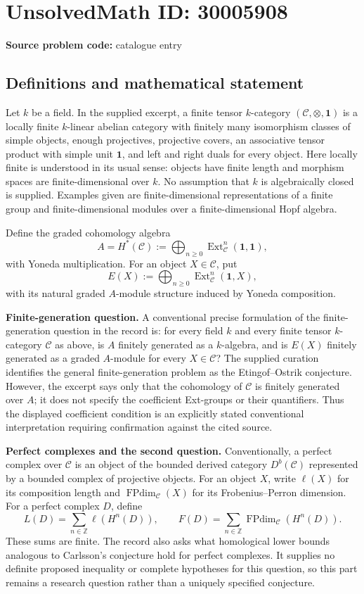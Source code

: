 \documentclass[11pt]{article}
\begin{document}
\section*{UnsolvedMath ID: 30005908}
\textbf{Source problem code:} catalogue entry
\subsection{Definitions and mathematical statement}
Let \(k\) be a field. In the supplied excerpt, a finite tensor \(k\)-category \((\mathcal C,\otimes,\mathbf 1)\) is a locally finite \(k\)-linear abelian category with finitely many isomorphism classes of simple objects, enough projectives, projective covers, an associative tensor product with simple unit \(\mathbf 1\), and left and right duals for every object. Here locally finite is understood in its usual sense: objects have finite length and morphism spaces are finite-dimensional over \(k\). No assumption that \(k\) is algebraically closed is supplied. Examples given are finite-dimensional representations of a finite group and finite-dimensional modules over a finite-dimensional Hopf algebra.

Define the graded cohomology algebra
\[
 A=H^*(\mathcal C):=\bigoplus_{n\geq 0}\operatorname{Ext}_{\mathcal C}^n(\mathbf 1,\mathbf 1),
\]
with Yoneda multiplication. For an object \(X\in\mathcal C\), put
\[
 E(X):=\bigoplus_{n\geq 0}\operatorname{Ext}_{\mathcal C}^n(\mathbf 1,X),
\]
with its natural graded \(A\)-module structure induced by Yoneda composition.

\textbf{Finite-generation question.} A conventional precise formulation of the finite-generation question in the record is: for every field \(k\) and every finite tensor \(k\)-category \(\mathcal C\) as above, is \(A\) finitely generated as a \(k\)-algebra, and is \(E(X)\) finitely generated as a graded \(A\)-module for every \(X\in\mathcal C\)? The supplied curation identifies the general finite-generation problem as the Etingof--Ostrik conjecture. However, the excerpt says only that the cohomology of \(\mathcal C\) is finitely generated over \(A\); it does not specify the coefficient Ext-groups or their quantifiers. Thus the displayed coefficient condition is an explicitly stated conventional interpretation requiring confirmation against the cited source.

\textbf{Perfect complexes and the second question.} Conventionally, a perfect complex over \(\mathcal C\) is an object of the bounded derived category \(D^b(\mathcal C)\) represented by a bounded complex of projective objects. For an object \(X\), write \(\ell(X)\) for its composition length and \(\operatorname{FPdim}_{\mathcal C}(X)\) for its Frobenius--Perron dimension. For a perfect complex \(D\), define
\[
 L(D)=\sum_{n\in\mathbb Z}\ell(H^n(D)),\qquad
 F(D)=\sum_{n\in\mathbb Z}\operatorname{FPdim}_{\mathcal C}(H^n(D)).
\]
These sums are finite. The record also asks what homological lower bounds analogous to Carlsson's conjecture hold for perfect complexes. It supplies no definite proposed inequality or complete hypotheses for this question, so this part remains a research question rather than a uniquely specified conjecture.
\end{document}
